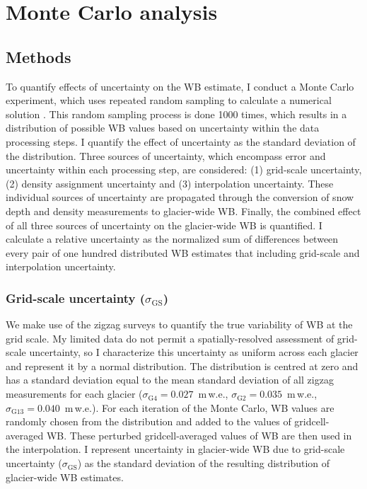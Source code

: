\documentclass{sfuthesis}
\begin{document}


\section{Monte Carlo analysis}
\label{sec:Unc_methods}

\subsection{Methods}
To quantify effects of uncertainty on the WB estimate, I conduct a Monte Carlo experiment, which uses repeated random sampling to calculate a numerical solution \citep{Metropolis1949}. This random sampling process is done 1000 times, which results in a distribution of possible WB values based on uncertainty within the data processing steps. I quantify the effect of uncertainty as the standard deviation of the distribution. Three sources of uncertainty, which encompass error and uncertainty within each processing step, are considered: (1) grid-scale uncertainty, (2) density assignment uncertainty and (3) interpolation uncertainty. These individual sources of uncertainty are propagated through the conversion of snow depth and density measurements to glacier-wide WB. Finally, the combined effect of all three sources of uncertainty on the glacier-wide WB is quantified. I calculate a relative uncertainty as the normalized sum of differences between every pair of one hundred distributed WB estimates that including grid-scale and interpolation uncertainty.

\subsubsection{Grid-scale uncertainty ($\sigma_{\mathrm{GS}}$)}
We make use of the zigzag surveys to quantify the true variability of WB at the grid scale. My limited data do not permit a spatially-resolved assessment of grid-scale uncertainty, so I characterize this uncertainty as uniform across each glacier and represent it by a normal distribution. The distribution is centred at zero and has a standard deviation equal to the mean standard deviation of all zigzag measurements for each glacier ($\sigma_{\mathrm{G4}} = 0.027 $ \,m\,w.e., $\sigma_{\mathrm{G2}} = 0.035$ \,m\,w.e., $\sigma_{\mathrm{G13}} = 0.040 $ \,m\,w.e.). For each iteration of the Monte Carlo, WB values are randomly chosen from the distribution and added to the values of gridcell-averaged WB. These perturbed gridcell-averaged values of WB are then used in the interpolation. I represent uncertainty in glacier-wide WB due to grid-scale uncertainty ($\sigma_{\mathrm{GS}}$) as the standard deviation of the resulting distribution of glacier-wide WB estimates.  
\end{document}
